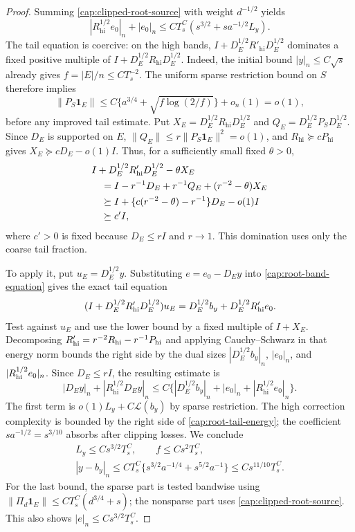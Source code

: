\begin{proof}
Summing \eqref{cap:clipped-root-source} with weight $d^{-1/2}$ yields
\[
 |R_{\mathrm{hi}}^{1/2}e_0|_n+|e_0|_n
 \le CT_s^C(s^{3/2}+sa^{-1/2}L_y).
\]
The tail equation is coercive: on the high bands,
$I+D_E^{1/2}R'_{\mathrm{hi}}D_E^{1/2}$ dominates a fixed positive multiple of
$I+D_E^{1/2}R_{\mathrm{hi}}D_E^{1/2}$. Indeed, the initial bound $|y|_n\le
C\sqrt s$ already gives $f=|E|/n\le CT_s^{-2}$. The uniform sparse restriction
bound on $S$ therefore implies
\[
 \|P_S\mathbf1_E\|
 \le C\{a^{3/4}+\sqrt{f\log(2/f)}\}+o_n(1)=o(1),
\]
before any improved tail estimate. Put $X_E=D_E^{1/2}R_{\mathrm{hi}}D_E^{1/2}$
and $Q_E=D_E^{1/2}P_SD_E^{1/2}$. Since $D_E$ is supported on $E$, $\|Q_E\|\le
r\|P_S\mathbf1_E\|^2=o(1)$, and $R_{\mathrm{hi}}\succeq cP_{\mathrm{hi}}$
gives $X_E\succeq cD_E-o(1)I$. Thus, for a sufficiently small fixed
$\theta>0$,
\[
 \begin{aligned}
 &I+D_E^{1/2}R'_{\mathrm{hi}}D_E^{1/2}-\theta X_E\mathstrut\\
 &\quad=I-r^{-1}D_E+r^{-1}Q_E+(r^{-2}-\theta)X_E\\
 &\quad\succeq I+\{c(r^{-2}-\theta)-r^{-1}\}D_E-o(1)I\\
 &\quad\succeq c'I,
 \end{aligned}
\]
where \(c'>0\) is fixed because \(D_E\le rI\) and \(r\to1\). This
domination uses only the coarse tail fraction.

To apply it, put \(u_E=D_E^{1/2}y\). Substituting \(e=e_0-D_Ey\) into
\eqref{cap:root-band-equation} gives the exact tail equation
\[
 (I+D_E^{1/2}R'_{\rm hi}D_E^{1/2})u_E
 =D_E^{1/2}b_y+D_E^{1/2}R'_{\rm hi}e_0 .
\]
Test against \(u_E\) and use the lower bound by a fixed multiple of
\(I+X_E\). Decomposing \(R'_{\rm hi}=r^{-2}R_{\rm hi}-r^{-1}P_{\rm hi}\)
and applying Cauchy--Schwarz in that energy norm bounds the right side by
the dual sizes \(|D_E^{1/2}b_y|_n\), \(|e_0|_n\), and
\(|R_{\rm hi}^{1/2}e_0|_n\). Since \(D_E\le rI\), the resulting estimate is
\begin{equation}\label{cap:root-tail-energy}
 |D_Ey|_n+|R_{\mathrm{hi}}^{1/2}D_Ey|_n
 \le C\{|D_E^{1/2}b_y|_n+|e_0|_n
                         +|R_{\mathrm{hi}}^{1/2}e_0|_n\}.
\end{equation}
The first term is $o(1)L_y+C\mathscr L(b_y)$ by sparse restriction. The high
correction complexity is bounded by the right side of
\eqref{cap:root-tail-energy}; the coefficient $sa^{-1/2}=s^{3/10}$ absorbs
after clipping losses. We conclude
\begin{equation}\label{cap:first-root-localization}
 \begin{gathered}
 L_y\le Cs^{3/2}T_s^C,\qquad f\le Cs^2T_s^C,\\
 |y-b_y|_n\le CT_s^C
       \{s^{3/2}a^{-1/4}+s^{5/2}a^{-1}\}
       \le Cs^{11/10}T_s^C.
 \end{gathered}
\end{equation}
For the last bound, the sparse part is tested bandwise using
$\|\Pi_d\mathbf1_E\|\le CT_s^C(d^{3/4}+s)$; the nonsparse part uses
\eqref{cap:clipped-root-source}. This also shows $|e|_n\le Cs^{3/2}T_s^C$.


\end{proof}
